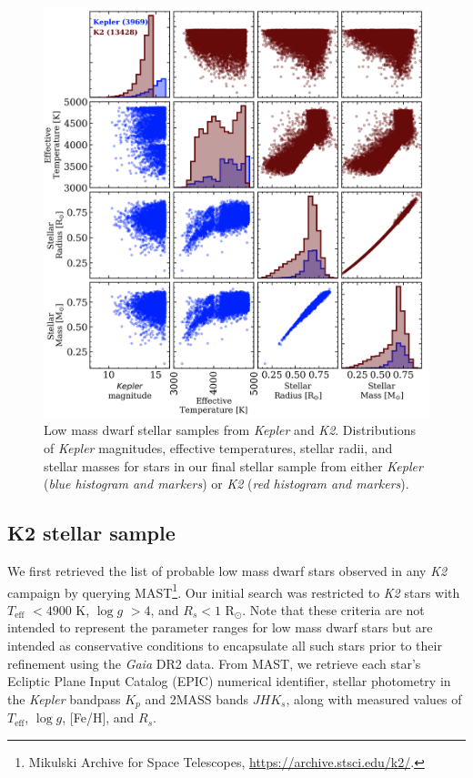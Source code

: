 \documentclass[twocolumn]{emulateapj}
\newcommand{\gaia}[1]{\emph{Gaia}#1}
\newcommand{\kepler}[1]{\emph{Kepler}#1}
\newcommand{\ktwo}[1]{\emph{K2}#1}
\newcommand{\teff}[1]{$T_{\text{eff}}$#1}
\newcommand{\logg}[1]{$\log{g}$#1}
\begin{document}
\begin{figure}
  \centering
  \includegraphics[width=0.98\hsize]{figures/stellar_corner_KepandK2.png}
  \caption{Low mass dwarf stellar samples from \kepler{} and \ktwo{.} Distributions of \kepler{} magnitudes,
    effective temperatures, stellar radii, and stellar masses for stars in our final stellar sample from either
    \kepler{} (\emph{blue histogram and markers}) or \ktwo{} (\emph{red histogram and markers}).}
  \label{fig:stars}
\end{figure}

\subsection{K2 stellar sample}
We first retrieved the list of probable low mass dwarf stars observed in any \ktwo{} campaign by querying
MAST\footnote{Mikulski Archive for Space Telescopes, \url{https://archive.stsci.edu/k2/}.}. Our initial
search was restricted to \ktwo{} stars with \teff{} $<4900$ K, \logg{} $>4$, and $R_s<1$ R$_{\odot}$. Note that these
criteria are not intended to represent the parameter ranges for low mass dwarf stars but are intended as
conservative conditions to encapsulate all such stars prior to their refinement using the \gaia{} DR2
data. From MAST, we retrieve each star's Ecliptic Plane Input Catalog
(EPIC) numerical identifier, stellar photometry in the \kepler{} bandpass $K_p$ and 2MASS bands $JHK_s$, along
with measured values of \teff{,} \logg{,} [Fe/H], and $R_s$.
\end{document}

